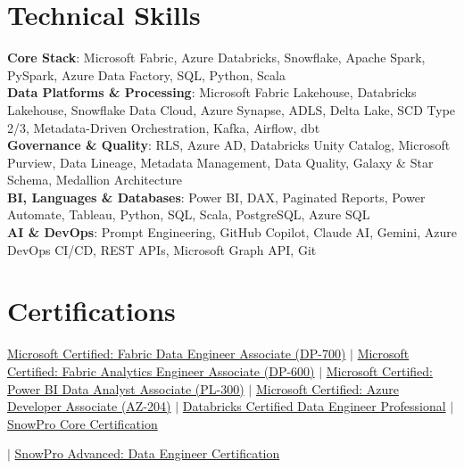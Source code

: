 \documentclass[letterpaper,10.5pt]{article}
\begin{document}
\section{Technical Skills}
 \begin{itemize}[leftmargin=0.15in, label={}]
    \small{\item{
     \textbf{Core Stack}{: Microsoft Fabric, Azure Databricks, Snowflake, Apache Spark, PySpark, Azure Data Factory, SQL, Python, Scala} \\
     \textbf{Data Platforms \& Processing}{: Microsoft Fabric Lakehouse, Databricks Lakehouse, Snowflake Data Cloud, Azure Synapse, ADLS, Delta Lake, SCD Type 2/3, Metadata-Driven Orchestration, Kafka, Airflow, dbt} \\
     \textbf{Governance \& Quality}{: RLS, Azure AD, Databricks Unity Catalog, Microsoft Purview, Data Lineage, Metadata Management, Data Quality, Galaxy \& Star Schema, Medallion Architecture} \\
     \textbf{BI, Languages \& Databases}{: Power BI, DAX, Paginated Reports, Power Automate, Tableau, Python, SQL, Scala, PostgreSQL, Azure SQL} \\
     \textbf{AI \& DevOps}{: Prompt Engineering, GitHub Copilot, Claude AI, Gemini, Azure DevOps CI/CD, REST APIs, Microsoft Graph API, Git}
     \\

    }}
 \end{itemize}
 \vspace{-16pt}

\section{Certifications}
 \begin{itemize}[leftmargin=0.15in, label={}]
    \small{\item{
     \href{https://learn.microsoft.com/en-us/users/01001464/credentials/certification/fabric-data-engineer-associate?tab=credentials-tab}{Microsoft Certified: Fabric Data Engineer Associate (DP-700)} $\vert$
     \href{https://learn.microsoft.com/en-us/users/01001464/credentials/certification/fabric-analytics-engineer-associate?tab=credentials-tab}{Microsoft Certified: Fabric Analytics Engineer Associate (DP-600)} $\vert$
     \href{https://learn.microsoft.com/en-us/users/01001464/credentials/certification/data-analyst-associate?tab=credentials-tab}{Microsoft Certified: Power BI Data Analyst Associate (PL-300)} $\vert$
     \href{https://learn.microsoft.com/en-us/users/01001464/credentials/certification/azure-developer?tab=credentials-tab}{Microsoft Certified: Azure Developer Associate (AZ-204)} $\vert$ \href{https://credentials.databricks.com/d43a3f8e-a606-4641-8c64-e98695820a11#acc.6fRr5b3P}{Databricks Certified Data Engineer Professional}
    }
    $\vert$ \href{https://achieve.snowflake.com/3655bd1e-2444-4f57-8946-7801aab2c09a#acc.jpvyMCNI}{SnowPro Core Certification}
    }
    $\vert$ \href{https://achieve.snowflake.com/3f93e55e-c8c2-42ee-bce5-a81b8a697441#acc.q4mMTjVf}{SnowPro Advanced: Data Engineer Certification}
    
 \end{itemize}
 \vspace{-16pt}
\end{document}
